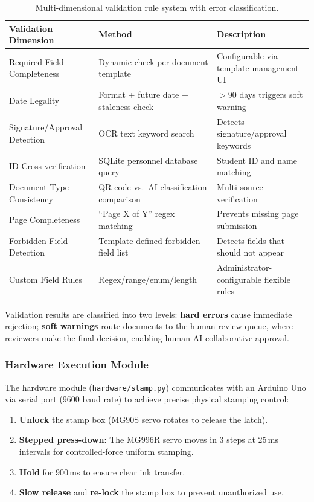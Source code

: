 \documentclass[conference]{IEEEtran}
\begin{document}
\begin{table}[H]
\centering
\caption{Multi-dimensional validation rule system with error classification.}
\label{tab:validation}
\begin{tabular}{@{}llp{4.5cm}@{}}
\toprule
\textbf{Validation Dimension} & \textbf{Method} & \textbf{Description} \\
\midrule
Required Field Completeness & Dynamic check per document template & Configurable via template management UI \\
Date Legality & Format + future date + staleness check & $>$90 days triggers soft warning \\
Signature/Approval Detection & OCR text keyword search & Detects signature/approval keywords \\
ID Cross-verification & SQLite personnel database query & Student ID and name matching \\
Document Type Consistency & QR code vs.\ AI classification comparison & Multi-source verification \\
Page Completeness & ``Page X of Y'' regex matching & Prevents missing page submission \\
Forbidden Field Detection & Template-defined forbidden field list & Detects fields that should not appear \\
Custom Field Rules & Regex/range/enum/length & Administrator-configurable flexible rules \\
\bottomrule
\end{tabular}
\end{table}

\noindent Validation results are classified into two levels: \textbf{hard errors} cause immediate rejection; \textbf{soft warnings} route documents to the human review queue, where reviewers make the final decision, enabling human-AI collaborative approval.

\subsubsection{Hardware Execution Module}

The hardware module (\texttt{hardware/stamp.py}) communicates with an Arduino Uno via serial port (9600 baud rate) to achieve precise physical stamping control:

\begin{enumerate}[leftmargin=*]
    \item \textbf{Unlock} the stamp box (MG90S servo rotates to release the latch).
    \item \textbf{Stepped press-down}: The MG996R servo moves in 3\textdegree{} steps at 25\,ms intervals for controlled-force uniform stamping.
    \item \textbf{Hold} for 900\,ms to ensure clear ink transfer.
    \item \textbf{Slow release} and \textbf{re-lock} the stamp box to prevent unauthorized use.
\end{enumerate}
\end{document}
